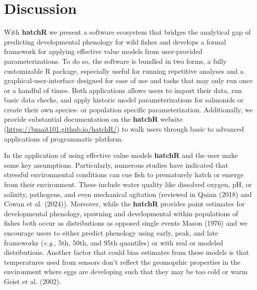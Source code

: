 \documentclass[webpdf,large,contemporary,namedate]{oup-authoring-template}
\theoremstyle{thmstyleone}
\theoremstyle{thmstyletwo}
\theoremstyle{thmstylethree}
\begin{document}
\section{Discussion}\label{discussion}

With \textbf{hatchR} we present a software ecosystem that bridges the
analytical gap of predicting developmental phenology for wild fishes and
develops a formal framework for applying effective value models from
user-provided parameterizations. To do so, the software is bundled in
two forms, a fully customizable R package, especially useful for running
repetitive analyses and a graphical-user-interface designed for ease of
use and tasks that may only run once or a handful of times. Both
applications allows users to import their data, run basic data checks,
and apply historic model parameterizations for salmonids or create their
own species- or population specific parameterization. Additionally, we
provide substantial documentation on the \textbf{hatchR} website
(\url{https://bmait101.github.io/hatchR/}) to walk users through basic
to advanced applications of programmatic platform.

In the application of using effective value models \textbf{hatchR} and
the user make some key assumptions. Particularly, numerous studies have
indicated that stressful environmental conditions can cue fish to
prematurely hatch or emerge from their environment. These include water
quality like dissolved oxygen, pH, or salinity, pathogens, and even
mechanical agitation (reviewed in Quinn (2018) and Cowan et al. (2024)).
Moreover, while the \textbf{hatchR} provides point estimates for
developmental phenology, spawning and developmental within populations
of fishes both occur as distributions as opposed single events Mason
(1976) and we encourage users to either predict phenology using early,
peak, and late frameworks (\emph{e.g.}, 5th, 50th, and 95th quantiles)
or with real or modeled distributions. Another factor that could bias
estimates from these models is that temperatures used from sensors don't
reflect the geomoprhic properties in the environment where eggs are
developing such that they may be too cold or warm Geist et al. (2002).
\end{document}
